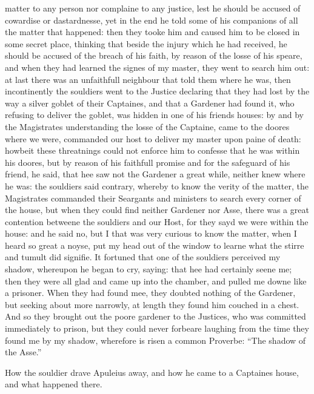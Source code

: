 matter to any person nor complaine to any justice, lest he should be accused of
cowardise or dastardnesse, yet in the end he told some of his companions of all
the matter that happened: then they tooke him and caused him to be closed in
some secret place, thinking that beside the injury which he had received, he
should be accused of the breach of his faith, by reason of the losse of his
speare, and when they had learned the signes of my master, they went to search
him out: at last there was an unfaithfull neighbour that told them where he
was, then incontinently the souldiers went to the Justice declaring that they
had lost by the way a silver goblet of their Captaines, and that a Gardener had
found it, who refusing to deliver the goblet, was hidden in one of his friends
houses: by and by the Magistrates understanding the losse of the Captaine, came
to the doores where we were, commanded our host to deliver my master upon paine
of death: howbeit these threatnings could not enforce him to confesse that he
was within his doores, but by reason of his faithfull promise and for the
safeguard of his friend, he said, that hee saw not the Gardener a great while,
neither knew where he was: the souldiers said contrary, whereby to know the
verity of the matter, the Magistrates commanded their Seargants and ministers
to search every corner of the house, but when they could find neither Gardener
nor Asse, there was a great contention betweene the souldiers and our Host, for
they sayd we were within the house: and he said no, but I that was very curious
to know the matter, when I heard so great a noyse, put my head out of the
window to learne what the stirre and tumult did signifie. It fortuned that one
of the souldiers perceived my shadow, whereupon he began to cry, saying: that
hee had certainly seene me; then they were all glad and came up into the
chamber, and pulled me downe like a prisoner. When they had found mee, they
doubted nothing of the Gardener, but seeking about more narrowly, at length
they found him couched in a chest. And so they brought out the poore gardener
to the Justices, who was committed immediately to prison, but they could never
forbeare laughing from the time they found me by my shadow, wherefore is risen
a common Proverbe: “The shadow of the Asse.”



How the souldier drave Apuleius away, and how he came to a Captaines house, and
what happened there.

